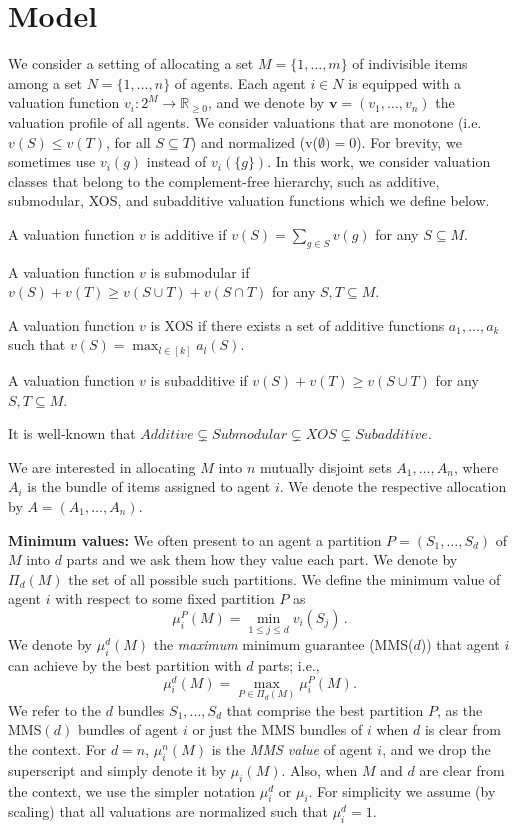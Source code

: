 \section{Model}
\label{sec:Model}


We consider a setting of allocating a set $M = \{1, \dots, m\}$ of indivisible items among a set $N = \{1, \dots, n\}$ of agents. 
Each agent $i \in N$ is equipped with a valuation function $v_i: 2^M \to \mathbb{R}_{\ge 0}$, and we denote by  $\boldsymbol{v} = (v_1, \dots, v_n)$ the valuation profile of all agents. 
We consider valuations that are monotone (i.e. $v(S) \le v(T)$, for all $S \subseteq T$) and normalized (v($\emptyset) = 0$). For brevity, we sometimes use $v_i(g)$ instead of $v_i(\{g\})$. 
In this work, we consider valuation classes that belong to the complement-free hierarchy, such as additive, submodular, XOS, and subadditive valuation functions which we define below.

 A valuation function $v$ is additive if $v(S) = \sum_{g \in S} v(g)$ for any $S \subseteq M$.    

 A valuation function $v$ is submodular if $v(S) + v(T) \ge v(S \cup T) + v(S \cap T)$ for any $S, T \subseteq M$.    


 A valuation function $v$ is XOS if there exists a set of additive functions $a_1, \dots, a_k$ such that $v(S) = \max_{l \in [k]}a_l(S)$.    

 A valuation function $v$ is subadditive if $v(S) + v(T) \ge v(S \cup T)$ for any $S, T \subseteq M$.

It is well-known that $Additive \subsetneq Submodular \subsetneq XOS \subsetneq Subadditive$.

We are interested in allocating $M$ into $n$ mutually disjoint sets $A_1,\ldots, A_n$, where $A_i$ is the bundle of items assigned to agent $i$. We denote the respective allocation by $A=(A_1, \ldots, A_n)$. 

{\bf Minimum values:} We often present to an agent a partition $P=(S_1,\ldots, S_d)$ of $M$ into $d$ parts and we ask them how they value each part. We denote by $\Pi_d(M)$ the set of all possible such partitions. We define the minimum value of agent $i$ with respect to some fixed partition $P$  as
$$\mu_i^{P}(M) = \min_{1\leq j \leq d} v_i(S_j)\,.$$
We denote by $\mu_i^{d}(M)$ the {\em maximum} minimum guarantee (MMS($d$)) that agent $i$ can achieve by the best partition with $d$ parts; i.e.,
$$\mu_i^{d}(M) = \max_{P \in \Pi_{d}(M)}\mu_i^{P}(M).$$
 We refer to the $d$ bundles $S_1,\ldots, S_d$ that comprise the best partition $P$, as the MMS$(d)$ bundles of agent $i$ or just the MMS bundles of $i$ when $d$ is clear from the context.  For $d=n$, $\mu_i^{n}(M)$ is the {\em MMS value} of agent $i$, and we drop the superscript and simply denote it by $\mu_i(M)$.  Also, when $M$ and $d$ are clear from the context, we use the simpler notation $\mu_i^{d}$ or $\mu_i$. For simplicity we assume (by scaling) that all valuations are normalized such that $\mu_i^{d}=1$. 

